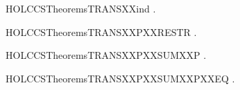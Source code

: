 \begin{SaveVerbatim}{HOLCCSTheoremsTRANSXXind}
       \HOLSymConst{\HOLTokenForall{}}  .  \HOLTokenTransBegin{}\HOLTokenTransEnd {} \HOLSymConst{\HOLTokenImp{}}    
\end{SaveVerbatim}
\newcommand{\HOLCCSTheoremsTRANSXXind}{\UseVerbatim{HOLCCSTheoremsTRANSXXind}}
\begin{SaveVerbatim}{HOLCCSTheoremsTRANSXXPXXRESTR}
\HOLTokenTurnstile{} \HOLSymConst{\HOLTokenForall{}}   .    \HOLTokenTransBegin{}\HOLTokenTransEnd {}   \HOLSymConst{\HOLTokenImp{}}  \HOLTokenTransBegin{}\HOLTokenTransEnd {}
\end{SaveVerbatim}
\newcommand{\HOLCCSTheoremsTRANSXXPXXRESTR}{\UseVerbatim{HOLCCSTheoremsTRANSXXPXXRESTR}}
\begin{SaveVerbatim}{HOLCCSTheoremsTRANSXXPXXSUMXXP}
\HOLTokenTurnstile{} \HOLSymConst{\HOLTokenForall{}}  .  \HOLSymConst{\ensuremath{+}}  \HOLTokenTransBegin{}\HOLTokenTransEnd {} \HOLSymConst{\HOLTokenImp{}}  \HOLTokenTransBegin{}\HOLTokenTransEnd {}
\end{SaveVerbatim}
\newcommand{\HOLCCSTheoremsTRANSXXPXXSUMXXP}{\UseVerbatim{HOLCCSTheoremsTRANSXXPXXSUMXXP}}
\begin{SaveVerbatim}{HOLCCSTheoremsTRANSXXPXXSUMXXPXXEQ}
\HOLTokenTurnstile{} \HOLSymConst{\HOLTokenForall{}}  .  \HOLSymConst{\ensuremath{+}}  \HOLTokenTransBegin{}\HOLTokenTransEnd {} \HOLSymConst{\HOLTokenEquiv{}}  \HOLTokenTransBegin{}\HOLTokenTransEnd {}
\end{SaveVerbatim}
\newcommand{\HOLCCSTheoremsTRANSXXPXXSUMXXPXXEQ}{\UseVerbatim{HOLCCSTheoremsTRANSXXPXXSUMXXPXXEQ}}
